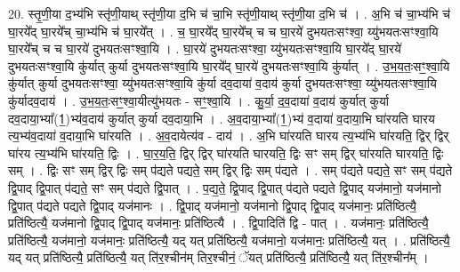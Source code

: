\documentclass[17pt]{extarticle}
\begin{document}
20. स्तृ॒णी॒या द॒भ्य॑भि स्तृ॑णी॒याथ् स्तृ॑णी॒या द॒भि च॑ चा॒भि स्तृ॑णी॒याथ् स्तृ॑णी॒या द॒भि च॑ । . अ॒भि च॑ चा॒भ्य॑भि च॑ घा॒रये᳚द् घा॒रये᳚च् चा॒भ्य॑भि च॑ घा॒रये᳚त् । . च॒ घा॒रये᳚द् घा॒रये᳚च् च च घा॒रये॑ दुभयतःसꣳश्वा॒ य्यु॑भयतःसꣳश्वा॒यि घा॒रये᳚च् च च घा॒रये॑ 
दुभयतःसꣳश्वा॒यि । . घा॒रये॑ दुभयतःसꣳश्वा॒ य्यु॑भयतःसꣳश्वा॒यि घा॒रये᳚द् घा॒रये॑ दुभयतःसꣳश्वा॒यि कु॑र्यात् कुर्या 
दुभयतःसꣳश्वा॒यि घा॒रये᳚द् घा॒रये॑ दुभयतःसꣳश्वा॒यि कु॑र्यात् । . उ॒भ॒य॒तः॒सꣳ॒॒श्वा॒यि कु॑र्यात् कुर्या दुभयतःसꣳश्वा॒ य्यु॑भयतःसꣳश्वा॒यि कु॑र्या दव॒दाया॑ व॒दाय॑ कुर्या दुभयतःसꣳश्वा॒ य्यु॑भयतःसꣳश्वा॒यि कु॑र्यादव॒दाय॑ । . उ॒भ॒य॒तः॒सꣳ॒॒श्वा॒यीत्यु॑भयतः - सꣳ॒॒श्वा॒यि । . कु॒र्या॒ द॒व॒दाया॑ व॒दाय॑ कुर्यात् कुर्या दव॒दाया॒भ्या᳚(1॒)भ्य॑व॒दाय॑ कुर्यात् कुर्या दव॒दाया॒भि । . अ॒व॒दाया॒भ्या᳚(1॒)भ्य॑ व॒दाया॑ व॒दाया॒भि घा॑रयति घारय त्य॒भ्य॑व॒दाया॑ व॒दाया॒भि घा॑रयति । . अ॒व॒दायेत्य॑व - दाय॑ । . अ॒भि घा॑रयति घारय त्य॒भ्य॑भि घा॑रयति॒ द्विर् द्विर् घा॑रय त्य॒भ्य॑भि घा॑रयति॒ द्विः । . घा॒र॒य॒ति॒ द्विर् द्विर् घा॑रयति घारयति॒ द्विः सꣳ सम् द्विर् घा॑रयति घारयति॒ द्विः सम् । . द्विः सꣳ सम् द्विर् द्विः सम् प॑द्यते पद्यते॒ सम् द्विर् द्विः सम् प॑द्यते । . सम् प॑द्यते पद्यते॒ सꣳ सम् प॑द्यते द्वि॒पाद् द्वि॒पात् प॑द्यते॒ सꣳ सम् प॑द्यते द्वि॒पात् । . प॒द्य॒ते॒ द्वि॒पाद् द्वि॒पात् प॑द्यते पद्यते द्वि॒पाद् यज॑मानो॒ यज॑मानो द्वि॒पात् प॑द्यते पद्यते द्वि॒पाद् यज॑मानः । . द्वि॒पाद् यज॑मानो॒ यज॑मानो द्वि॒पाद् द्वि॒पाद् यज॑मानः॒ प्रति॑ष्ठित्यै॒ प्रति॑ष्ठित्यै॒ यज॑मानो द्वि॒पाद् द्वि॒पाद् यज॑मानः॒ प्रति॑ष्ठित्यै । . द्वि॒पादिति॑ द्वि - पात् । . यज॑मानः॒ प्रति॑ष्ठित्यै॒ प्रति॑ष्ठित्यै॒ यज॑मानो॒ यज॑मानः॒ प्रति॑ष्ठित्यै॒ यद् यत् प्रति॑ष्ठित्यै॒ यज॑मानो॒ यज॑मानः॒ प्रति॑ष्ठित्यै॒ यत् । . प्रति॑ष्ठित्यै॒ यद् यत् प्रति॑ष्ठित्यै॒ प्रति॑ष्ठित्यै॒ यत् ति॑र॒श्चीन॑म् तिर॒श्चीनं॒ ॅयत् प्रति॑ष्ठित्यै॒ प्रति॑ष्ठित्यै॒ यत् ति॑र॒श्चीन᳚म् । \newline
\end{document}
